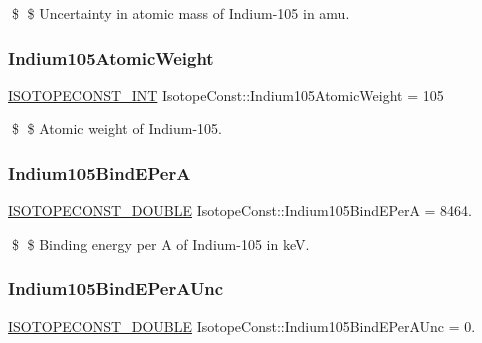 \$ \$ Uncertainty in atomic mass of Indium-\/105 in amu. \mbox{\label{group___isotope_const-_indium-_in105_ga4f2d3c47a71f25913e9ab6e79de574d2}} 
\subsubsection{\texorpdfstring{Indium105\+Atomic\+Weight}{Indium105AtomicWeight}}
{\footnotesize\ttfamily \mbox{\hyperlink{group___isotope_const-_macros_ga5f18360b3e99483a35c32d789e62621c}{I\+S\+O\+T\+O\+P\+E\+C\+O\+N\+S\+T\+\_\+\+I\+NT}} Isotope\+Const\+::\+Indium105\+Atomic\+Weight = 105}

\$ \$ Atomic weight of Indium-\/105. \mbox{\label{group___isotope_const-_indium-_in105_gab9973d2b96b7e5bbfb13de0abd7a6bae}} 
\subsubsection{\texorpdfstring{Indium105\+Bind\+E\+PerA}{Indium105BindEPerA}}
{\footnotesize\ttfamily \mbox{\hyperlink{group___isotope_const-_macros_ga8f45a7272ce02c0b4c65c44636ed719a}{I\+S\+O\+T\+O\+P\+E\+C\+O\+N\+S\+T\+\_\+\+D\+O\+U\+B\+LE}} Isotope\+Const\+::\+Indium105\+Bind\+E\+PerA = 8464.}

\$ \$ Binding energy per A of Indium-\/105 in keV. \mbox{\label{group___isotope_const-_indium-_in105_gaeaab489a500c378cbbc220a0cc772876}} 
\subsubsection{\texorpdfstring{Indium105\+Bind\+E\+Per\+A\+Unc}{Indium105BindEPerAUnc}}
{\footnotesize\ttfamily \mbox{\hyperlink{group___isotope_const-_macros_ga8f45a7272ce02c0b4c65c44636ed719a}{I\+S\+O\+T\+O\+P\+E\+C\+O\+N\+S\+T\+\_\+\+D\+O\+U\+B\+LE}} Isotope\+Const\+::\+Indium105\+Bind\+E\+Per\+A\+Unc = 0.}

